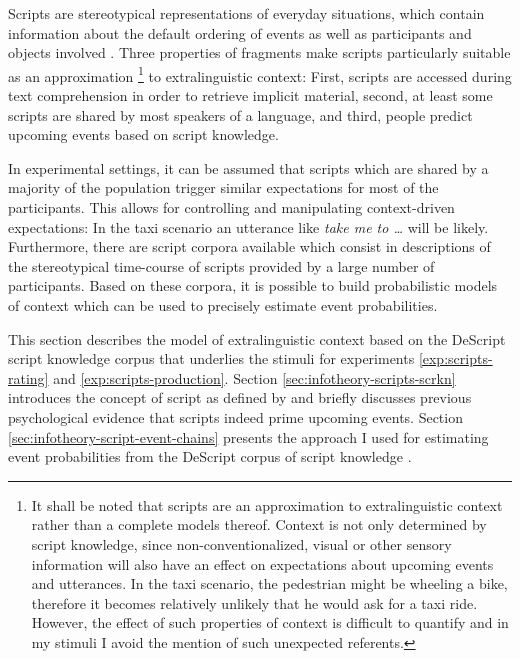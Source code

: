 Scripts \citep{schank.abelson1977} are stereotypical representations of everyday situations, which contain information about the default ordering of events as well as participants and objects involved \citep{bower.etal1979}. Three properties of fragments make scripts particularly suitable as an approximation%
%
\footnote{It shall be noted that scripts are an approximation to extralinguistic context rather than a complete models thereof. Context is not only determined by script knowledge, since non-conventionalized, visual or other sensory information will also have an effect on expectations about upcoming events and utterances. In the taxi scenario, the pedestrian might be wheeling a bike, therefore it becomes relatively unlikely that he would ask for a taxi ride. However, the effect of such properties of context is difficult to quantify and in my stimuli I avoid the mention of such unexpected referents.}\afterfn%
%
to extralinguistic context: First, scripts are accessed during text comprehension in order to retrieve implicit material, second, at least some scripts are shared by most speakers of a language, and third, people predict upcoming events based on script knowledge.

In experimental settings, it can be assumed that scripts which are shared by a majority of the population trigger similar expectations for most of the participants. This allows for controlling and manipulating context-driven expectations: In the taxi scenario an utterance like \textit{take me to \dots} will be likely. Furthermore, there are script corpora available which consist in descriptions of the stereotypical time-course of scripts provided by a large number of participants. Based on these corpora, it is possible to build probabilistic models of context which can be used to precisely estimate event probabilities. 

This section describes the model of extralinguistic context based on the DeScript script knowledge corpus \citep{wanzare.etal2016} that underlies the stimuli for experiments \ref{exp:scripts-rating} and \ref{exp:scripts-production}. Section \ref{sec:infotheory-scripts-scrkn} introduces the concept of script as defined by \citet{schank.abelson1977} and briefly discusses previous psychological evidence that scripts indeed prime upcoming events. Section \ref{sec:infotheory-script-event-chains} presents the approach I used for estimating event probabilities from the DeScript corpus of script knowledge \citep{wanzare.etal2016}.

